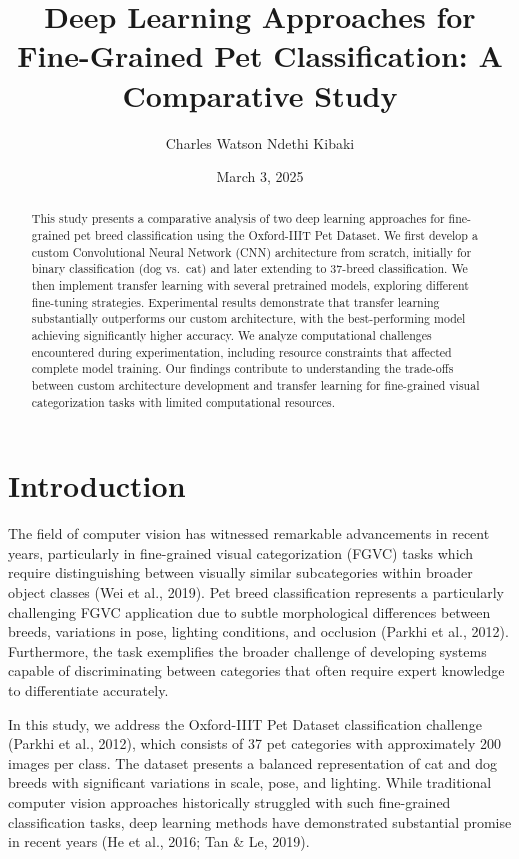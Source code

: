 \documentclass[
]{article}
\title{Deep Learning Approaches for Fine-Grained Pet Classification: A
Comparative Study}
\author{Charles Watson Ndethi Kibaki}
\date{March 3, 2025}
\begin{document}
\maketitle
\begin{abstract}
This study presents a comparative analysis of two deep learning
approaches for fine-grained pet breed classification using the
Oxford-IIIT Pet Dataset. We first develop a custom Convolutional Neural
Network (CNN) architecture from scratch, initially for binary
classification (dog vs.~cat) and later extending to 37-breed
classification. We then implement transfer learning with several
pretrained models, exploring different fine-tuning strategies.
Experimental results demonstrate that transfer learning substantially
outperforms our custom architecture, with the best-performing model
achieving significantly higher accuracy. We analyze computational
challenges encountered during experimentation, including resource
constraints that affected complete model training. Our findings
contribute to understanding the trade-offs between custom architecture
development and transfer learning for fine-grained visual categorization
tasks with limited computational resources.
\end{abstract}


\section{Introduction}\label{introduction}

The field of computer vision has witnessed remarkable advancements in
recent years, particularly in fine-grained visual categorization (FGVC)
tasks which require distinguishing between visually similar
subcategories within broader object classes (Wei et al., 2019). Pet
breed classification represents a particularly challenging FGVC
application due to subtle morphological differences between breeds,
variations in pose, lighting conditions, and occlusion (Parkhi et al.,
2012). Furthermore, the task exemplifies the broader challenge of
developing systems capable of discriminating between categories that
often require expert knowledge to differentiate accurately.

In this study, we address the Oxford-IIIT Pet Dataset classification
challenge (Parkhi et al., 2012), which consists of 37 pet categories
with approximately 200 images per class. The dataset presents a balanced
representation of cat and dog breeds with significant variations in
scale, pose, and lighting. While traditional computer vision approaches
historically struggled with such fine-grained classification tasks, deep
learning methods have demonstrated substantial promise in recent years
(He et al., 2016; Tan \& Le, 2019).
\end{document}
